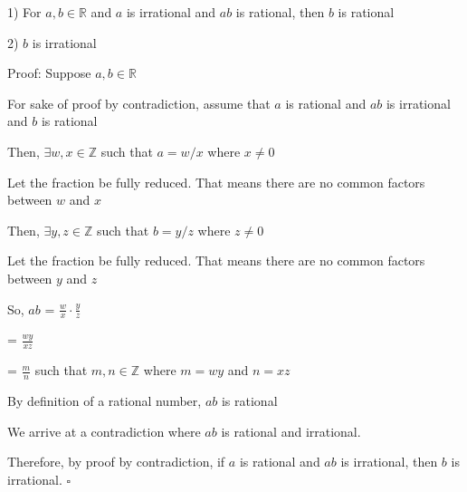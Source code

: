 \documentclass{article} %
\begin{document}
    1) For $a, b \in \mathbb{R}$ and $a$ is irrational and $ab$ is rational, then $b$ is rational

    2) $b$ is irrational

    \vspace*{0.3cm}

    Proof: Suppose $a, b \in \mathbb{R}$

    For sake of proof by contradiction, assume that $a$ is rational and $ab$ is irrational and $b$ is rational
    
    Then, $\exists w, x \in \mathbb{Z}$ such that $a = w/x$ where $x \neq 0$

    Let the fraction be fully reduced. That means there are no common factors between $w$ and $x$
    
    Then, $\exists y, z \in \mathbb{Z}$ such that $b = y/z$ where $z \neq 0$

    Let the fraction be fully reduced. That means there are no common factors between $y$ and $z$

    So, $ab$ = $\frac{w}{x} \cdot \frac{y}{z}$ 
    
    \vspace*{0.1cm}

    \tabto*{1.55cm} = $\frac{wy}{xz}$

    \vspace*{0.1cm}

    \tabto*{1.55cm} = $\frac{m}{n}$ such that $m, n \in \mathbb{Z}$ where $m = wy$ and $n = xz$

    By definition of a rational number, $ab$ is rational

    We arrive at a contradiction where $ab$ is rational and irrational.

    Therefore, by proof by contradiction, if $a$ is rational and $ab$ is irrational, then $b$ is irrational. $\square$


    





    
\end{document}
